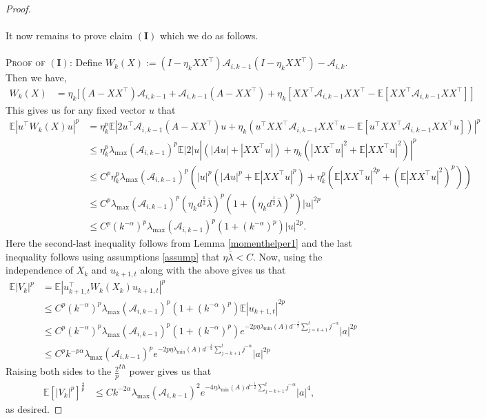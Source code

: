 \documentclass[11pt, reqno,english]{amsart}
\begin{document}
\begin{proof}
\\\\
It now remains to prove claim $(\mathbf{I})$ which we do as follows.
\\\\
\textsc{Proof of $(\mathbf{I})$:}
Define $W_k(X) := (I - \eta_kXX^\top)\mathcal A_{i,k-1}(I - \eta_kXX^\top) - \mathcal A_{i,k}$. Then we have,
\begin{align*}
W_k(X) &= \eta_k [(A - XX^\top) \mathcal A_{i,k-1} + \mathcal A_{i,k-1}(A - XX^\top) + \eta_k [XX^\top \mathcal A_{i,k-1} XX^\top - \mathbb{E}[XX^\top \mathcal A_{i,k-1} XX^\top]]
\end{align*}
This gives us for any fixed vector $u$ that
\begin{align*}
\mathbb{E}|u^\top W_k(X) u|^p &= \eta^p_k\mathbb{E}|2u^\top \mathcal A_{i,k-1} (A - XX^\top)u  + \eta_k(u^\top XX^\top \mathcal A_{i,k-1} XX^\top u - \mathbb{E}[u^\top XX^\top \mathcal A_{i,k-1}XX^\top u])|^p
\\
&\leq \eta^p_k\lambda_{\max}(\mathcal A_{i,k-1})^p\mathbb{E}|2|u|(|Au| + |XX^\top u|) + \eta_k(|XX^\top u|^2 + \mathbb{E}|XX^\top u|^2)|^p
\\
&\leq C^p \eta_k^p \lambda_{\max}(\mathcal A_{i,k-1})^p(|u|^p(|Au|^p + \mathbb{E}|XX^\top u|^p) +  \eta_k^p(\mathbb{E}|XX^\top u|^{2p} + (\mathbb{E}|XX^\top u|^2)^p))
\\
&\leq C^p\lambda_{\max}(\mathcal A_{i,k-1})^p(\eta_kd^{\frac{1}{2}}\bar{\lambda})^p (1 + (\eta_k d^{\frac{1}{2}}\bar{\lambda})^p)|u|^{2p}
\\
&\leq C^p(k^{-\alpha})^p \lambda_{\max}(\mathcal A_{i,k-1})^p(1 + (k^{-\alpha})^p)|u|^{2p}.
\end{align*}
Here the second-last inequality follows from Lemma \ref{momenthelper1} and the last inequality follows using assumptions \ref{assump} that $\eta \bar{\lambda} < C$. Now, using the independence of $X_k$ and $u_{k+1,t}$ along with the above gives us that
\begin{align*}
\mathbb{E}|V_k|^p &= \mathbb{E}|u^\top_{k+1,t} W_k(X_k) u_{k+1,t}|^p
\\
&\leq C^p(k^{-\alpha})^p \lambda_{\max}(\mathcal A_{i,k-1})^p(1 + (k^{-\alpha})^p)\mathbb{E}|u_{k+1,t}|^{2p}
\\
&\leq C^p(k^{-\alpha})^p \lambda_{\max}(\mathcal A_{i,k-1})^p(1 + (k^{-\alpha})^p)e^{- 2p\eta\lambda_{\min}(A)d^{-\frac{1}{2}}\sum_{j = k+1}^{t}j^{-\alpha}}|a|^{2p}
\\
&\leq C^pk^{-p\alpha} \lambda_{\max}(\mathcal A_{i,k-1})^pe^{- 2p\eta\lambda_{\min}(A)d^{-\frac{1}{2}}\sum_{j = k+1}^{t}j^{-\alpha}}|a|^{2p}
\end{align*}
Raising both sides to the $\frac{2}{p}^{th}$ power gives us that
\begin{align*}
\mathbb{E}[|V_k|^p]^{\frac{2}{p}} &\leq Ck^{-2\alpha} \lambda_{\max}(\mathcal A_{i,k-1})^2e^{- 4\eta\lambda_{\min}(A)d^{-\frac{1}{2}}\sum_{j = k+1}^{t}j^{-\alpha}}|a|^4,
\end{align*}
as desired.
\end{proof}
\end{document}
